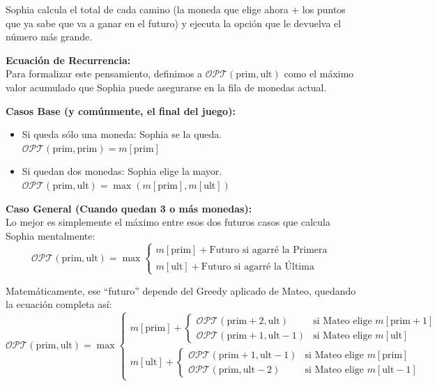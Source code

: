 Sophia calcula el total de cada camino (la moneda que elige ahora + los puntos que ya sabe que va a ganar en el futuro) y ejecuta la opción que le devuelva el número más grande.

\vspace{1ex}
\noindent \textbf{Ecuación de Recurrencia:}\label{rec:ecRecu} 
\\
Para formalizar este pensamiento, definimos a $\mathcal{O}\mathcal{P}\mathcal{T}(\text{prim}, \text{ult})$ como el máximo valor acumulado que Sophia puede asegurarse en la fila de monedas actual.

\textbf{Casos Base (y comúnmente, el final del juego):}
\begin{itemize}
    \item Si queda sólo una moneda: Sophia se la queda. $\mathcal{O}\mathcal{P}\mathcal{T}(\text{prim}, \text{prim}) = m[\text{prim}]$
    \item Si quedan dos monedas: Sophia elige la mayor. $\mathcal{O}\mathcal{P}\mathcal{T}(\text{prim}, \text{ult}) = \max(m[\text{prim}], m[\text{ult}])$
\end{itemize}

\textbf{Caso General (Cuando quedan 3 o más monedas):} \\
Lo mejor es simplemente el máximo entre esos dos futuros casos que calcula Sophia mentalmente:
\[
\mathcal{O}\mathcal{P}\mathcal{T}(\text{prim}, \text{ult}) = \max 
\begin{cases} 
    m[\text{prim}] + \text{Futuro si agarré la Primera} \\ 
    m[\text{ult}] + \text{Futuro si agarré la Última}
\end{cases}
\]

Matemáticamente, ese ``futuro'' depende del Greedy aplicado de Mateo, quedando la ecuación completa así:
\[
\mathcal{O}\mathcal{P}\mathcal{T}(\text{prim}, \text{ult}) = \max 
\begin{cases} 
    m[\text{prim}] + 
    \begin{cases} 
        \mathcal{O}\mathcal{P}\mathcal{T}(\text{prim} + 2, \text{ult}) & \text{si Mateo elige } m[\text{prim} + 1] \\ 
        \mathcal{O}\mathcal{P}\mathcal{T}(\text{prim} + 1, \text{ult} - 1) & \text{si Mateo elige } m[\text{ult}] 
    \end{cases} \\[1.5em]
    
    m[\text{ult}] + 
    \begin{cases} 
        \mathcal{O}\mathcal{P}\mathcal{T}(\text{prim} + 1, \text{ult} - 1) & \text{si Mateo elige } m[\text{prim}] \\ 
        \mathcal{O}\mathcal{P}\mathcal{T}(\text{prim}, \text{ult} - 2) & \text{si Mateo elige } m[\text{ult} - 1] 
    \end{cases} 
\end{cases}
\]

